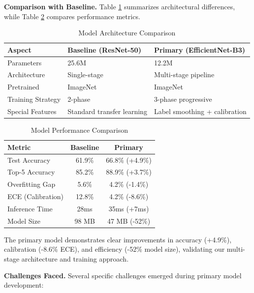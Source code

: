 \documentclass[final]{article}
\begin{document}
\textbf{Comparison with Baseline.} Table \ref{tab:comparison} summarizes architectural differences, while Table \ref{tab:performance} compares performance metrics.

\begin{table}[h]
\centering
\caption{Model Architecture Comparison}
\label{tab:comparison}
\begin{tabular}{lll}
\toprule
\textbf{Aspect} & \textbf{Baseline (ResNet-50)} & \textbf{Primary (EfficientNet-B3)} \\
\midrule
Parameters & 25.6M & 12.2M \\
Architecture & Single-stage & Multi-stage pipeline \\
Pretrained & ImageNet & ImageNet \\
Training Strategy & 2-phase & 3-phase progressive \\
Special Features & Standard transfer learning & Label smoothing + calibration \\
\bottomrule
\end{tabular}
\end{table}

\begin{table}[h]
\centering
\caption{Model Performance Comparison}
\label{tab:performance}
\begin{tabular}{lcc}
\toprule
\textbf{Metric} & \textbf{Baseline} & \textbf{Primary} \\
\midrule
Test Accuracy & 61.9\% & 66.8\% (+4.9\%) \\
Top-5 Accuracy & 85.2\% & 88.9\% (+3.7\%) \\
Overfitting Gap & 5.6\% & 4.2\% (-1.4\%) \\
ECE (Calibration) & 12.8\% & 4.2\% (-8.6\%) \\
Inference Time & 28ms & 35ms (+7ms) \\
Model Size & 98 MB & 47 MB (-52\%) \\
\bottomrule
\end{tabular}
\end{table}

The primary model demonstrates clear improvements in accuracy (+4.9\%), calibration (-8.6\% ECE), and efficiency (-52\% model size), validating our multi-stage architecture and training approach.

\textbf{Challenges Faced.} Several specific challenges emerged during primary model development:
\end{document}
